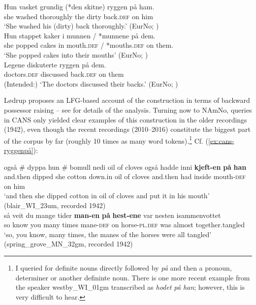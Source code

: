 \documentclass[output=paper,colorlinks,citecolor=brown]{langscibook}
\begin{document}
\ea 
\ea \label{ex:på-modified} \gll *Hun vasket grundig (*den skitne) ryggen på ham.\\
she washed thoroughly the dirty back.\textsc{def} on him\\
\glt `She washed his (dirty) back thoroughly.' (EurNo; \citealt[236]{lodrup2018prominent})\\
\ex \label{ex:kakerimunnene} \gll Hun stappet kaker i munnen / *munnene på dem. \\
she popped cakes in mouth.\textsc{def} / *mouths.\textsc{def} on them.\\
\glt `She popped cakes into their mouths' (EurNo; \citealt[237]{lodrup2018prominent})\\
\ex \label{ex:diskuterteryggen} \gll *Legene diskuterte ryggen på dem.\\
doctors.\textsc{def} discussed back.\textsc{def} on them\\
\glt (Intended:) `The doctors discussed their backs.' (EurNo; \citealt[237]{lodrup2018prominent})\\
\z 
\z 


\noindent Lødrup proposes an LFG-based account of the construction in terms of backward possessor raising -- see \citet{lodrup2018prominent} for details of the analysis. Turning now to NAmNo,  queries in CANS only yielded clear examples of this construction  in the older recordings  (1942), even though the recent recordings (2010--2016) constitute the biggest part of the corpus by far (roughly 10 times as many word tokens).\footnote{I queried for definite nouns directly followed by \emph{på} and then a pronoun, determiner or another defininte noun. There is  one more recent example from the speaker westby\_WI\_01gm transcribed as \emph{hodet på han}; however, this  is very difficult to hear.} Cf. (\ref{ex:cans-ryggenpå}):

\ea \label{ex:cans-ryggenpå}
\ea \gll  også \# dyppa hun \# bomull nedi oil of cloves også hadde inni \textbf{kjeft-en} \textbf{på} \textbf{han}\\
and.then {} dipped she {} cotton down.in oil of cloves and.then had inside mouth-\textsc{def} on him\\
\glt `and then she dipped cotton in oil of cloves and put it in his mouth' (blair\_WI\_23um, recorded 1942)\\
\ex \label{ex:manenpåhestene} \gll så veit du mange tider \textbf{man-en} \textbf{på} \textbf{hest-ene} var nesten isammenvottet\\
so know you many times mane-\textsc{def} on horse-\textsc{pl.def} was almost together.tangled \\
\glt `so, you know, many times, the manes of the horses were all tangled'
(spring\_grove\_MN\_32gm, recorded 1942)\\
\z 
\z 
\end{document}
